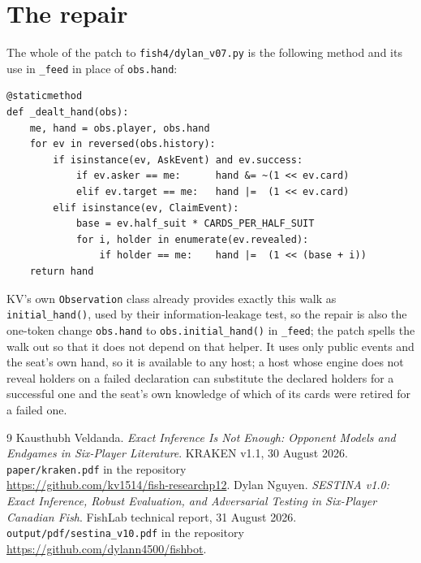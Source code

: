 \documentclass[11pt]{article}
\newcommand{\code}[1]{\texttt{#1}}
\begin{document}
\section{The repair}

The whole of the patch to \code{fish4/dylan\_v07.py} is the following method and its use in
\code{\_feed} in place of \code{obs.hand}:
\begin{lstlisting}
@staticmethod
def _dealt_hand(obs):
    me, hand = obs.player, obs.hand
    for ev in reversed(obs.history):
        if isinstance(ev, AskEvent) and ev.success:
            if ev.asker == me:      hand &= ~(1 << ev.card)
            elif ev.target == me:   hand |=  (1 << ev.card)
        elif isinstance(ev, ClaimEvent):
            base = ev.half_suit * CARDS_PER_HALF_SUIT
            for i, holder in enumerate(ev.revealed):
                if holder == me:    hand |=  (1 << (base + i))
    return hand
\end{lstlisting}
KV's own \code{Observation} class already provides exactly this walk as \code{initial\_hand()}, used by
their information-leakage test, so the repair is also the one-token change \code{obs.hand} to
\code{obs.initial\_hand()} in \code{\_feed}; the patch spells the walk out so that it does not depend
on that helper. It uses only public events and the seat's own hand, so it is available to any host; a host whose
engine does not reveal holders on a failed declaration can substitute the declared holders for a
successful one and the seat's own knowledge of which of its cards were retired for a failed one.

\begin{thebibliography}{9}
 Kausthubh Veldanda. \emph{Exact Inference Is Not Enough: Opponent Models and Endgames
in Six-Player Literature}. KRAKEN v1.1, 30 August 2026. \code{paper/kraken.pdf} in the repository\\
\url{https://github.com/kv1514/fish-researchp12}.
 Dylan Nguyen. \emph{SESTINA v1.0: Exact Inference, Robust Evaluation, and
Adversarial Testing in Six-Player Canadian Fish}. FishLab technical report, 31 August 2026.
\code{output/pdf/sestina\_v10.pdf} in the repository\\
\url{https://github.com/dylann4500/fishbot}.
\end{thebibliography}
\end{document}
